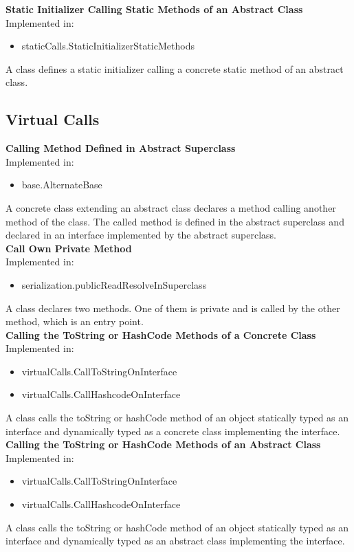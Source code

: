 \documentclass{article}
\begin{document}
\noindent
\textbf{Static Initializer Calling Static Methods of an Abstract Class}\\
Implemented in: 
\begin{itemize}
    \item staticCalls.StaticInitializerStaticMethods
\end{itemize}
A class defines a static initializer calling a concrete static method of an abstract class.\\


\subsection{Virtual Calls}

\textbf{Calling Method Defined in Abstract Superclass}\\
Implemented in: 
\begin{itemize}
    \item base.AlternateBase
\end{itemize}
A concrete class extending an abstract class declares a method calling another method of the class. The called method is defined in the abstract superclass and declared in an interface implemented by the abstract superclass.\\

\noindent
\textbf{Call Own Private Method}\\
Implemented in: 
\begin{itemize}
    \item serialization.publicReadResolveInSuperclass
\end{itemize}
A class declares two methods. One of them is private and is called by the other method, which is an entry point.\\

\noindent
\textbf{Calling the ToString or HashCode Methods of a Concrete Class}\\
Implemented in: 
\begin{itemize}
    \item virtualCalls.CallToStringOnInterface
    \item virtualCalls.CallHashcodeOnInterface
\end{itemize}
A class calls the toString or hashCode method of an object statically typed as an interface and dynamically typed as a concrete class implementing the interface.\\

\noindent
\textbf{Calling the ToString or HashCode Methods of an Abstract Class}\\
Implemented in: 
\begin{itemize}
    \item virtualCalls.CallToStringOnInterface
    \item virtualCalls.CallHashcodeOnInterface
\end{itemize}
A class calls the toString or hashCode method of an object statically typed as an interface and dynamically typed as an abstract class implementing the interface.\\
\end{document}
